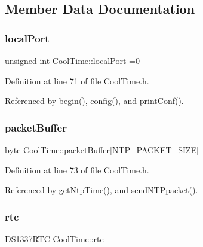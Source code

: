 \subsection{Member Data Documentation}
\mbox{\label{classCoolTime_a2f777da44d7ba678be8185299e9b49d1}} 
\subsubsection{\texorpdfstring{local\+Port}{localPort}}
{\footnotesize\ttfamily unsigned int Cool\+Time\+::local\+Port =0\hspace{0.3cm}{\ttfamily [private]}}



Definition at line 71 of file Cool\+Time.\+h.



Referenced by begin(), config(), and print\+Conf().

\mbox{\label{classCoolTime_a27e6abc82a5c2f72161956967005bec7}} 
\subsubsection{\texorpdfstring{packet\+Buffer}{packetBuffer}}
{\footnotesize\ttfamily byte Cool\+Time\+::packet\+Buffer\mbox{[}\hyperlink{CoolTime_8h_a56a6ea64006651b4f42adf713e244f06}{N\+T\+P\+\_\+\+P\+A\+C\+K\+E\+T\+\_\+\+S\+I\+ZE}\mbox{]}\hspace{0.3cm}{\ttfamily [private]}}



Definition at line 73 of file Cool\+Time.\+h.



Referenced by get\+Ntp\+Time(), and send\+N\+T\+Ppacket().

\mbox{\label{classCoolTime_abd38f2384ff90692b1568d9db869412e}} 
\subsubsection{\texorpdfstring{rtc}{rtc}}
{\footnotesize\ttfamily D\+S1337\+R\+TC Cool\+Time\+::rtc\hspace{0.3cm}{\ttfamily [private]}}



